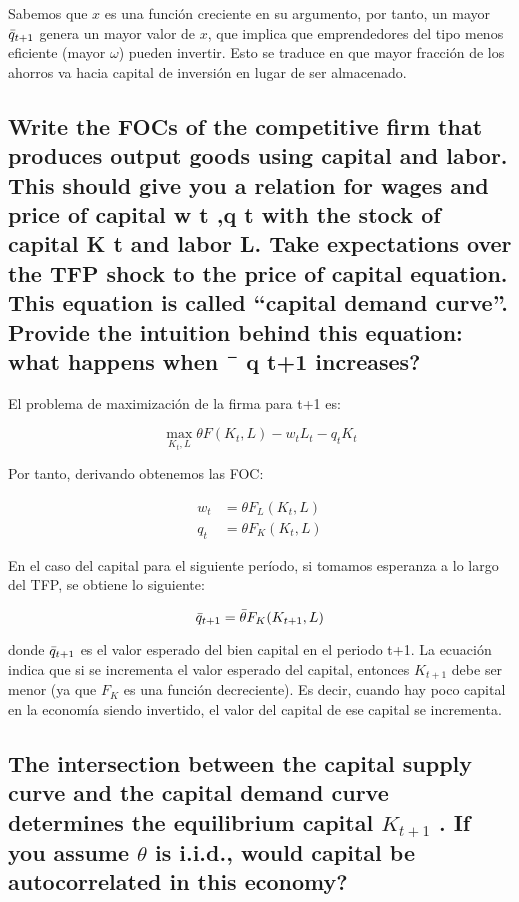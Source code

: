 \documentclass[12pt]{article}
\begin{document}
Sabemos que $x$ es una función creciente en su argumento, por tanto, un mayor $\Bar{q}_{t+1}$ genera un mayor valor de $x$, que implica que emprendedores del tipo menos eficiente (mayor $\omega$) pueden invertir. Esto se traduce en que mayor fracción de los ahorros va hacia capital de inversión en lugar de ser almacenado.

\subsection{ Write the FOCs of the competitive firm that produces output goods using
capital and labor. This should give you a relation for wages and price of
capital w t ,q t with the stock of capital K t and labor L. Take expectations
over the TFP shock to the price of capital equation. This equation is called
“capital demand curve”. Provide the intuition behind this equation: what
happens when ¯ q t+1 increases?}

El problema de maximización de la firma para t+1 es:

\[
    \max_{K_{t}, L} \theta F(K_{t}, L) - w_{t}L_{t} - q_{t}K_{t}
\]

Por tanto, derivando obtenemos las FOC:

\begin{align*}
    w_{t} &= \theta F_L(K_{t}, L) \\
    q_t &=  \theta F_K(K_{t}, L)
\end{align*}

En el caso del capital para el siguiente período, si tomamos esperanza a lo largo del TFP, se obtiene lo siguiente:

\begin{equation}
\label{capital_demand_curve}
        \Bar{q}_{t+1} = \Bar{\theta} F_K(K_{t+1}, L)
\end{equation}

donde $\Bar{q}_{t+1}$ es el valor esperado del bien capital en el periodo t+1. La ecuación indica que si se incrementa el valor esperado del capital, entonces $K_{t+1}$ debe ser menor (ya que $F_K$ es una función decreciente). Es decir, cuando hay poco capital en la economía siendo invertido, el valor del capital de ese capital se incrementa.

\subsection{ The intersection between the capital supply curve and the capital demand
curve determines the equilibrium capital $K_{t+1}$ . If you assume $\theta$ is i.i.d.,
would capital be autocorrelated in this economy?}
\end{document}
